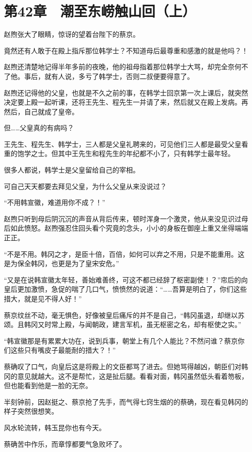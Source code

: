 \section{第42章　潮至东崂触山回（上）}

赵煦张大了眼睛，惊讶的望着台陛下的蔡京。

竟然还有人敢于在殿上指斥那位韩学士？不知道母后最尊重和感激的就是他吗？！

赵煦还清楚地记得半年多前的夜晚，他的祖母指着那位韩学士大骂，却完全奈何不了他。事后，就有人说，多亏了韩学士，否则二叔便要得意了。

赵煦还记得他的父皇，也就是不久之前的事，在韩学士回京第一次上课后，就突然决定要上殿一起听课，还将王先生、程先生一并请了来，然后就又在殿上发病。再然后，自己就成了皇帝。

但……父皇真的有病吗？

王先生、程先生、韩学士，三人都是父皇礼聘来的，可见他们三人都是最受父皇看重的饱学之士。但其中王先生和程先生的年纪都不小了，只有韩学士最年轻。

很多人都说，韩学士是父皇留给自己的宰相。

可自己天天都要去拜见父皇，为什么父皇从来没说过？

“不用韩宣徽，难道用你不成？！”

赵煦只听到母后阴沉沉的声音从背后传来，顿时浑身一个激灵，他从来没见识过母后如此愤怒。赵煦强忍住回头看个究竟的念头，小小的身板在御座上重又坐得端端正正。

“不是不用。韩冈之才，是臣十倍，百倍，如何可以弃之不用，只是不能重用。这是为保全韩冈，也更是为了皇宋安危。”

“又是在说韩宣徽太年轻，善始难善终，可这不都已经辞了枢密副使！？”帘后的向皇后更加激愤，急促的喘了几口气，愤愤然的说道：“……吾算是明白了，你们这些措大，就是见不得人好！”

蔡京纹丝不动，毫无惧色，好像被皇后痛斥的并不是自己，“韩冈虽退，却继以苏颂。且韩冈又时常上殿，与闻朝政，建言军机，虽无枢密之名，却有枢使之实。”

“韩宣徽那是有累累大功在，说到兵事，朝堂上有几个人能比？不然问谁？蔡京你们这些只有嘴皮子最能耐的措大？！”

蔡确叹了口气，向皇后这是将殿上的文臣都骂了进去。但她骂得越凶，朝臣们对韩冈的意见就越大。这不是帮忙，这是扯后腿。看看对面，韩冈虽然低头看着笏板，但也能看到他是一脸的无奈。

半刻钟前，因赵挺之、蔡京抢了先手，而气得七窍生烟的的蔡确，现在看见韩冈的样子突然很想笑。

风水轮流转，韩玉昆你也有今天。

蔡确苦中作乐，而章惇都要气急败坏了。

